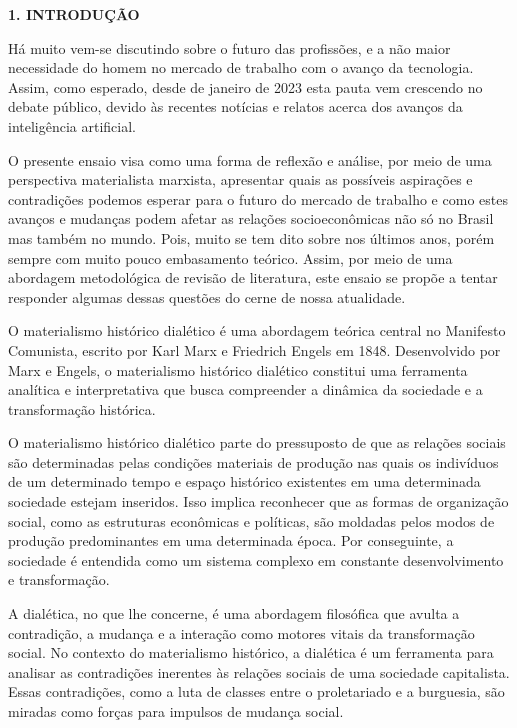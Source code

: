 \begin{titulo}
    \raggedright\raggedright\textbf{1. INTRODUÇÃO}
\end{titulo}
\par
Há muito vem-se discutindo sobre o futuro das profissões, e a não maior necessidade do homem no mercado de trabalho com o avanço da tecnologia. Assim, como esperado, desde de janeiro de 2023 esta pauta vem crescendo no debate público, devido às recentes notícias e relatos acerca dos avanços da inteligência artificial.
\par
O presente ensaio visa como uma forma de reflexão e análise, por meio de uma perspectiva materialista marxista, apresentar quais as possíveis aspirações e contradições podemos esperar para o futuro do mercado de trabalho e como estes avanços e mudanças podem afetar as relações socioeconômicas não só no Brasil mas também no mundo. Pois, muito se tem dito sobre nos últimos anos, porém sempre com muito pouco embasamento teórico. Assim, por meio de uma abordagem metodológica de revisão de literatura, este ensaio se propõe a tentar responder algumas dessas questões do cerne de nossa atualidade.
\par
O materialismo histórico dialético é uma abordagem teórica central no Manifesto Comunista, escrito por Karl Marx e Friedrich Engels em 1848. Desenvolvido por Marx e Engels, o materialismo histórico dialético constitui uma ferramenta analítica e interpretativa que busca compreender a dinâmica da sociedade e a transformação histórica.
\par
O materialismo histórico dialético parte do pressuposto de que as relações sociais são determinadas pelas condições materiais de produção nas quais os indivíduos de um determinado tempo e espaço histórico existentes em uma determinada sociedade estejam inseridos. Isso implica reconhecer que as formas de organização social, como as estruturas econômicas e políticas, são moldadas pelos modos de produção predominantes em uma determinada época. Por conseguinte, a sociedade é entendida como um sistema complexo em constante desenvolvimento e transformação.
\par
A dialética, no que lhe concerne, é uma abordagem filosófica que avulta a contradição, a mudança e a interação como motores vitais da transformação social. No contexto do materialismo histórico, a dialética é um ferramenta para analisar as contradições inerentes às relações sociais de uma sociedade capitalista. Essas contradições, como a luta de classes entre o proletariado e a burguesia, são miradas como forças para impulsos de mudança social.
